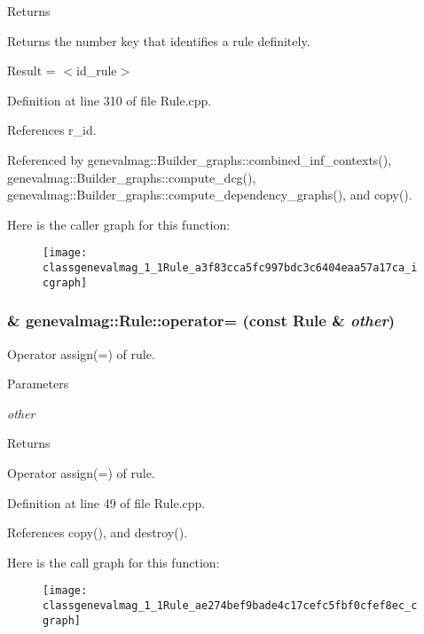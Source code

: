 \begin{DoxyReturn}{Returns}

\end{DoxyReturn}
Returns the number key that identifies a rule definitely.

Result = $<$id\_\-rule$>$ 

Definition at line 310 of file Rule.cpp.



References r\_\-id.



Referenced by genevalmag::Builder\_\-graphs::combined\_\-inf\_\-contexts(), genevalmag::Builder\_\-graphs::compute\_\-dcg(), genevalmag::Builder\_\-graphs::compute\_\-dependency\_\-graphs(), and copy().



Here is the caller graph for this function:\nopagebreak
\begin{figure}[H]
\begin{center}
\leavevmode
\texttt{[image: classgenevalmag\_1\_1Rule\_a3f83cca5fc997bdc3c6404eaa57a17ca\_icgraph]}
\end{center}
\end{figure}


\hypertarget{classgenevalmag_1_1Rule_ae274bef9bade4c17cefc5fbf0cfef8ec}{
\subsubsection[{operator=}]{ \& genevalmag::Rule::operator= (const {\bf Rule} \& {\em other})}}
\label{classgenevalmag_1_1Rule_ae274bef9bade4c17cefc5fbf0cfef8ec}
Operator assign(=) of rule. 
\begin{DoxyParams}{Parameters}
\item[{\em other}]\end{DoxyParams}
\begin{DoxyReturn}{Returns}

\end{DoxyReturn}
Operator assign(=) of rule. 

Definition at line 49 of file Rule.cpp.



References copy(), and destroy().



Here is the call graph for this function:\nopagebreak
\begin{figure}[H]
\begin{center}
\leavevmode
\texttt{[image: classgenevalmag\_1\_1Rule\_ae274bef9bade4c17cefc5fbf0cfef8ec\_cgraph]}
\end{center}
\end{figure}


